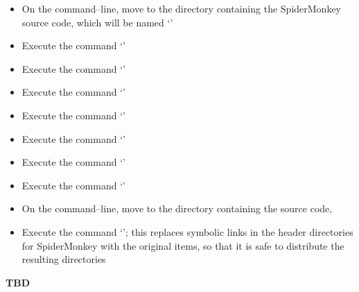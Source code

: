 \begin{itemize}
\item On the command--line, move to the directory containing the SpiderMonkey source code,
which will be named `'
\item Execute the command `'
\item Execute the command `'
\item Execute the command `'
\item Execute the command `'
\item Execute the command `'
\item Execute the command `'
\item Execute the command `'
\item On the command--line, move to the directory containing the \mplusm{} source code,
\item Execute the command
`'; this replaces
symbolic links in the header directories for SpiderMonkey with the original items, so that
it is safe to distribute the resulting directories
\end{itemize}
\tertiaryEnd{}
\textbf{TBD}
\tertiaryEnd{}
\secondaryEnd{}
